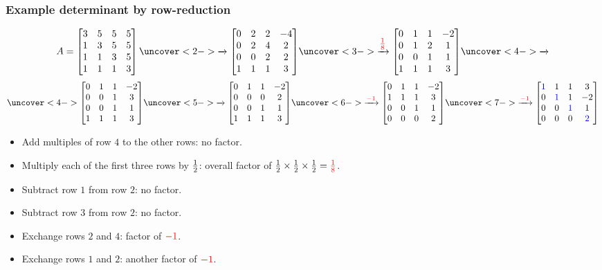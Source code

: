 \documentclass[9pt]{beamer}
\begin{document}
\begin{frame}[t]
 \frametitle{Example determinant by row-reduction}
 
 \[
  A= 
  \bbm 3&5&5&5 \\
       1&3&5&5 \\
       1&1&3&5 \\
       1&1&1&3 \ebm 
  \uc<2->{\xra{}
  \bbm 0&2&2&-4 \\
       0&2&4&2 \\
       0&0&2&2 \\
       1&1&1&3 \ebm}
  \uc<3->{\xra{\RED{\tfrac{1}{8}}}
  \bbm 0&1&1&-2 \\
       0&1&2&1 \\
       0&0&1&1 \\
       1&1&1&3 \ebm}
  \uc<4->{\xra{}}
 \] \[
  \uc<4->{\bbm 0&1&1&-2 \\
       0&0&1&3 \\
       0&0&1&1 \\
       1&1&1&3 \ebm}
  \uc<5->{\xra{}
  \bbm 0&1&1&-2 \\
       0&0&0&2 \\
       0&0&1&1 \\
       1&1&1&3 \ebm}
  \uc<6->{\xra{\RED{-1}}
  \bbm 0&1&1&-2 \\
       1&1&1&3 \\
       0&0&1&1 \\
       0&0&0&2 \ebm}
  \uc<7->{\xra{\RED{-1}}
  \bbm \BLUE{1}&1&1&3 \\
       0&\BLUE{1}&1&-2 \\
       0&0&\BLUE{1}&1 \\
       0&0&0&\BLUE{2} \ebm}
 \]
 \begin{itemize}
  \item<2-> Add multiples of row $4$ to the other rows: no factor.
  \item<3-> Multiply each of the first three rows by $\tfrac{1}{2}$:
   overall factor of $\tfrac{1}{2}\times\tfrac{1}{2}\times\tfrac{1}{2}={\color{red}\frac{1}{8}}$.
  \item<4-> Subtract row $1$ from row $2$: no factor.
  \item<5-> Subtract row $3$ from row $2$: no factor.
  \item<6-> Exchange rows $2$ and $4$: factor of ${\color{red}-1}$.
  \item<7-> Exchange rows $1$ and $2$: another factor of ${\color{red}-1}$.
 \end{itemize}
\end{frame}
\end{document}

